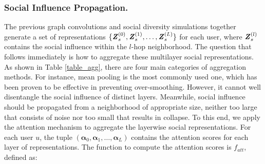 \documentclass[letterpaper]{article} %
\begin{document}
\subsubsection{Social Influence Propagation.}
The previous graph convolutions and social diversity simulations together generate a set of representations $\{\textbf{\textit{Z}}_s^{(0)}, \textbf{\textit{Z}}_s^{(1)}, \ldots, \textbf{\textit{Z}}_s^{(L)}\}$ for each user, where $\textbf{\textit{Z}}_s^{(l)}$ contains the social influence within the $l$-hop neighborhood. The question that follows  immediately is how to aggregate these multilayer social representations. As shown in Table \ref{table_agg}, there are four main categories of aggregation methods. For instance, mean pooling is the most commonly used one, which has been proven to be effective in preventing over-smoothing. However, it cannot well disentangle the social influence of distinct layers. Meanwhile, social influence should be propagated from a neighborhood of appropriate size, neither too large that consists of noise nor too small that results in collapse. To this end, we apply the attention mechanism \cite{attention} to aggregate the layerwise social representations. For each user $u$, the tuple $(\boldsymbol{\alpha}_{0},\boldsymbol{\alpha}_{1},\ldots,\boldsymbol{\alpha}_{L})$ contains the attention scores for each layer of representations. The function to compute the attention scores is $f_{att}$, defined as:
\end{document}
